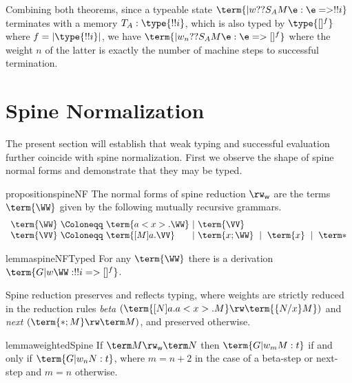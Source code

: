 \documentclass[10pt,a4paper]{amsart}
\newcommand\spine{\mathsf w}
\begin{document}
Combining both theorems, since a typeable state $\term{|w ??{S_A}M\e: \e=>!!i}$ terminates with a memory $T_A:\type{!!i}$, which is also typed by $\type{[]^f}$ where $f=|\type{!!i}|$, we have $\term{|w_n ??{S_A}M\e: \e =>[]^f}$ where the weight $n$ of the latter is exactly the number of machine steps to successful termination.


\section{Spine Normalization}
\label{sec:spine}

The present section will establish that weak typing and successful evaluation further coincide with spine normalization. First we observe the shape of spine normal forms and demonstrate that they may be typed.


\begin{restatable}{proposition}{spineNF}
\label{prop:spine NF}
The normal forms of spine reduction $\rw_\spine$ are the terms $\term{\WW}$ given by the following mutually recursive grammars.
\[
\begin{array}{l@{~}l@{~}l@{~}l@{~}l}
	\term{\WW} &\Coloneqq& \term{a<x>.\WW} &\mid& \term{\VV}
\\	\term{\VV} &\Coloneqq& \term{[M]a.\VV} &\mid& \term{x;\WW} ~\mid~ \term{x}  ~\mid~ \term*
\end{array}
\]
\end{restatable}


\begin{restatable}{lemma}{spineNFTyped}
\label{lem:spine NF => typed}
For any $\term{\WW}$ there is a derivation $\term{G |w \WW : !!i => []^f}$.
\end{restatable}


Spine reduction preserves and reflects typing, where weights are strictly reduced in the reduction rules \emph{beta} $(\term{[N]a.a<x>.M}\rw\term{\{N/x\}M})$ and \emph{next} $(\term{*;M}\rw\term M)$, and preserved otherwise.


\begin{restatable}{lemma}{weightedSpine}
\label{lem:spine reduction}
If $\term M\rw_\spine\term N$ then $\term{G |w_m M:t}$ if and only if $\term{G |w_n N:t}$, where $m=n+2$ in the case of a beta-step or next-step and $m=n$ otherwise.
\end{restatable}
\end{document}
